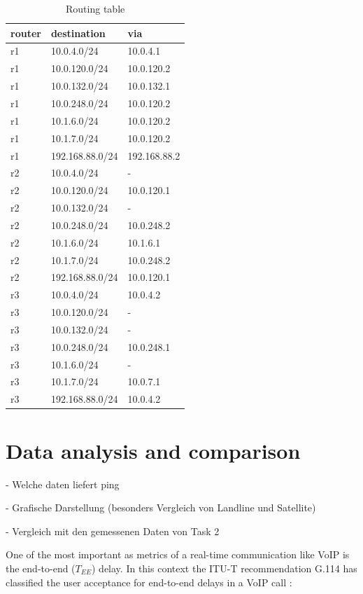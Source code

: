 \documentclass[parskip=full]{scrartcl}
\begin{document}
\begin{table}[hb]
	\centering

	\begin{tabular}{lll}
		\toprule
		\textbf{router} & \textbf{destination} & \textbf{via}  \\ \midrule
		r1 & 10.0.4.0/24 & 10.0.4.1 \\
		r1 & 10.0.120.0/24 & 10.0.120.2 \\
		r1 & 10.0.132.0/24 & 10.0.132.1 \\
		r1 & 10.0.248.0/24 & 10.0.120.2 \\
		r1 & 10.1.6.0/24 & 10.0.120.2 \\
		r1 & 10.1.7.0/24 & 10.0.120.2 \\
		r1 & 192.168.88.0/24 & 192.168.88.2\\
		\midrule
		r2 & 10.0.4.0/24 & - \\
		r2 & 10.0.120.0/24 & 10.0.120.1 \\
		r2 & 10.0.132.0/24 & - \\
		r2 & 10.0.248.0/24 & 10.0.248.2 \\
		r2 & 10.1.6.0/24 & 10.1.6.1 \\
		r2 & 10.1.7.0/24 & 10.0.248.2 \\
		r2 & 192.168.88.0/24 & 10.0.120.1\\
		\midrule
		r3 & 10.0.4.0/24 & 10.0.4.2 \\
		r3 & 10.0.120.0/24 & - \\
		r3 & 10.0.132.0/24 & - \\
		r3 & 10.0.248.0/24 & 10.0.248.1 \\
		r3 & 10.1.6.0/24 & - \\
		r3 & 10.1.7.0/24 & 10.0.7.1 \\
		r3 & 192.168.88.0/24 & 10.0.4.2\\
		\bottomrule
	\end{tabular}
	\caption{Routing table}
	\label{tab:routing}
\end{table}
\clearpage
\section{Data analysis and comparison} \label{sec:data}
- Welche daten liefert ping

- Grafische Darstellung (besonders Vergleich von Landline und Satellite)

- Vergleich mit den gemessenen Daten von Task 2

One of the most important as metrics of a real-time communication like VoIP is the end-to-end ($T_{EE}$) delay. In this context the ITU-T recommendation G.114 has classified the user acceptance for end-to-end delays in a VoIP call \cite{ITU-TRecommendationG.114}:
\end{document}
